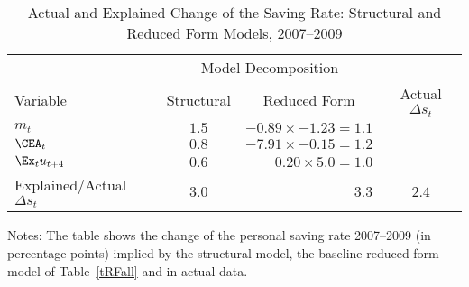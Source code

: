 \hypertarget{tPred}{}
\begin{table}[H]
\begin{center}
\caption{ Actual and Explained Change of the Saving Rate: Structural and Reduced Form Models, 2007--2009} \label{tGRdecomp}
\begin{tabular}{@{}lcrc@{}}\\
\toprule
      & \multicolumn{2}{c}{Model Decomposition}& \\
      \cmidrule(l){2-3}
     Variable & \multicolumn{1}{c}{Structural }& \multicolumn{1}{c}{Reduced Form }& \multicolumn{1}{c}{Actual $\Delta s_t$ }\\
\midrule
$m_t$ & $ 1.5 $ & $ -0.89 \times -1.23 = 1.1 $ & \\
$\CEA_t$ & $0.8 $ & $ -7.91 \times -0.15 = 1.2 $ &  \\
$\Ex_t u_{t+4} $ & $ 0.6 $ & $ 0.20 \times 5.0 = 1.0 $ & \\\midrule
Explained/Actual $\Delta s_t$ &  3.0 &  3.3 & 2.4\\
\bottomrule
\end{tabular}
\end{center}
 {\footnotesize Notes: The table shows the change of the personal saving rate 2007--2009 (in percentage points) implied by the structural model, the baseline reduced form model of Table~\ref{tRFall} and in actual data.}
\end{table}
